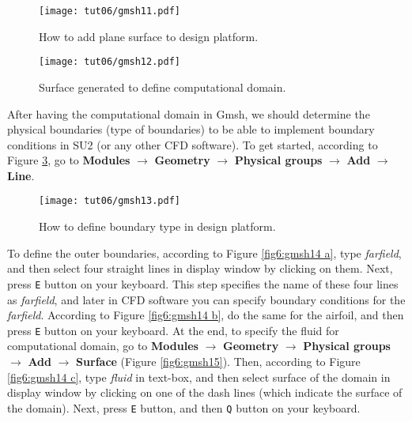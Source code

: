 \begin{figure}[htbp]
    \centering
    \texttt{[image: tut06/gmsh11.pdf]}
    \caption{How to add plane surface to design platform.}
    \label{fig6:gmsh11}
\end{figure}
\begin{figure}[htbp]
    \centering
    \texttt{[image: tut06/gmsh12.pdf]}
    \caption{Surface generated to define computational domain.}
    \label{fig6:gmsh12}
\end{figure}
After having the computational domain in Gmsh, we should determine the physical boundaries (type of boundaries) to be able to implement boundary conditions in SU2 (or any other CFD software). To get started, according to Figure \ref{fig6:gmsh13}, go to \textbf{Modules} $\rightarrow$ \textbf{Geometry} $\rightarrow$ \textbf{Physical groups} $\rightarrow$ \textbf{Add} $\rightarrow$ \textbf{Line}.
\begin{figure}[htbp]
    \centering
    \texttt{[image: tut06/gmsh13.pdf]}
    \caption{How to define boundary type in design platform.}
    \label{fig6:gmsh13}
\end{figure}
To define the outer boundaries, according to Figure \ref{fig6:gmsh14 a}, type \textit{farfield}, and then select four straight lines in display window by clicking on them. Next, press \texttt{E} button on your keyboard. This step specifies the name of these four lines as \textit{farfield}, and later in CFD software you can specify boundary conditions for the \textit{farfield}. According to Figure \ref{fig6:gmsh14 b}, do the same for the airfoil, and then press \texttt{E} button on your keyboard. At the end, to specify the fluid for computational domain, go to \textbf{Modules} $\rightarrow$ \textbf{Geometry} $\rightarrow$ \textbf{Physical groups} $\rightarrow$ \textbf{Add} $\rightarrow$ \textbf{Surface} (Figure \ref{fig6:gmsh15}). Then, according to Figure \ref{fig6:gmsh14 c}, type \textit{fluid} in text-box, and then select surface of the domain in display window by clicking on one of the dash lines (which indicate the surface of the domain). Next, press \texttt{E} button, and then \texttt{Q} button on your keyboard.
